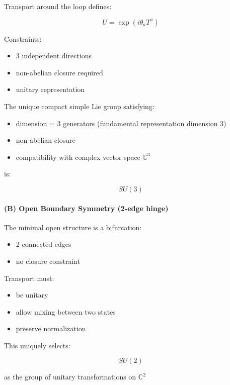 \documentclass[
]{article}
\providecommand{\tightlist}{%
  \setlength{\itemsep}{0pt}\setlength{\parskip}{0pt}}
\begin{document}
Transport around the loop defines:

\[
U = \exp(i \theta_a T^a)
\]

Constraints:

\begin{itemize}
\tightlist
\item
  3 independent directions
\item
  non-abelian closure required
\item
  unitary representation
\end{itemize}

The unique compact simple Lie group satisfying:

\begin{itemize}
\tightlist
\item
  dimension = 3 generators (fundamental representation dimension 3)
\item
  non-abelian closure
\item
  compatibility with complex vector space \(\mathbb{C}^3\)
\end{itemize}

is:

\[
SU(3)
\]

\hypertarget{b-open-boundary-symmetry-2-edge-hinge}{%
\paragraph{(B) Open Boundary Symmetry (2-edge
hinge)}\label{b-open-boundary-symmetry-2-edge-hinge}}

The minimal open structure is a bifurcation:

\begin{itemize}
\tightlist
\item
  2 connected edges
\item
  no closure constraint
\end{itemize}

Transport must:

\begin{itemize}
\tightlist
\item
  be unitary
\item
  allow mixing between two states
\item
  preserve normalization
\end{itemize}

This uniquely selects:

\[
SU(2)
\]

as the group of unitary transformations on \(\mathbb{C}^2\)
\end{document}
